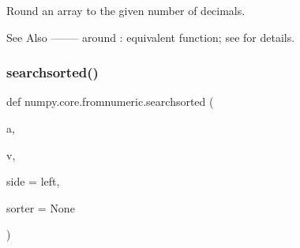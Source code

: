 \begin{DoxyVerb}Round an array to the given number of decimals.

See Also
--------
around : equivalent function; see for details.
\end{DoxyVerb}
 \mbox{\label{namespacenumpy_1_1core_1_1fromnumeric_ab6546094daae7f66978e896bd47eeb89}} 
\subsubsection{\texorpdfstring{searchsorted()}{searchsorted()}}
{\footnotesize\ttfamily def numpy.\+core.\+fromnumeric.\+searchsorted (\begin{DoxyParamCaption}\item[{}]{a,  }\item[{}]{v,  }\item[{}]{side = {\ttfamily \textquotesingle{}left\textquotesingle{}},  }\item[{}]{sorter = {\ttfamily None} }\end{DoxyParamCaption})}

